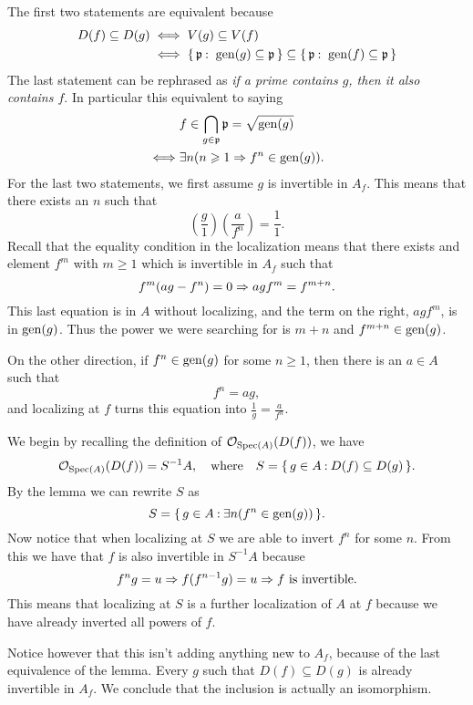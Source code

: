 \documentclass[12pt]{memoir}
\begin{document}
    \begin{ptcb}
        The first two statements are equivalent because 
        \begin{align*}
            D(f)\subseteq D(g)&\iff V(g)\subseteq V(f)\\
            &\iff \{\,\mathfrak{p}\mathbin{:}\ \operatorname{gen}(g)\subseteq\mathfrak{p}\,\}\subseteq \{\,\mathfrak{p}\mathbin{:}\ \operatorname{gen}(f)\subseteq\mathfrak{p}\,\}
        \end{align*}
        The last statement can be rephrased as \emph{if a prime contains $g$, then it also contains $f$}. In particular this equivalent to saying 
        \begin{align*}
        &f\in\bigcap_{g\in\mathfrak{p}}\mathfrak{p}=\sqrt{\operatorname{gen}(g)}\\
        \iff &\exists n(n\geqslant 1\Rightarrow f^n\in\operatorname{gen}(g)).
        \end{align*}
        For the last two statements, we first assume $g$ is invertible in $A_f$. This means that there exists an $n$ such that
        $$\left(\frac{g}{1}\right)\left(\frac{a}{f^n}\right)=\frac{1}{1}.$$
        Recall that the equality condition in the localization means that there exists and element $f^m$ with $m\geq 1$ which is invertible in $A_f$ such that 
        $$f^m(ag-f^n)=0\Rightarrow agf^m=f^{m+n}.$$
        This last equation is in $A$ without localizing, and the term on the right, $agf^m$, is in $\operatorname{gen}(g)$. Thus the power we were searching for is $m+n$ and $f^{m+n}\in\operatorname{gen}(g)$.\par 
        On the other direction, if $f^n\in\operatorname{gen}(g)$ for some $n\geq 1$, then there is an $a\in A$ such that 
        $$f^n=ag,$$
        and localizing at $f$ turns this equation into $\frac{1}{g}=\frac{a}{f^n}$. 
    \end{ptcb}
    \begin{ptcbr}
    We begin by recalling the definition of $\mathcal{O}_{\operatorname{Spec}(A)}(D(f))$, we have 
    $$\mathcal{O}_{\operatorname{Spec}(A)}(D(f))=S^{-1}A,\quad\text{where}\quad S=\{\,g\in A\mathbin{:} D(f)\subseteq D(g)\,\}.$$
    By the lemma we can rewrite $S$ as
    $$S=\{\,g\in A\mathbin{:} \exists n(f^n\in\operatorname{gen}(g))\,\}.$$
    Now notice that when localizing at $S$ we are able to invert $f^n$ for some $n$. From this we have that $f$ is also invertible in $S^{-1}A$ because 
    $$f^ng=u\Rightarrow f(f^{n-1}g)=u\Rightarrow f\text{ is invertible}.$$
    This means that localizing at $S$ is a further localization of $A$ at $f$ because we have already inverted all powers of $f$.\par 
    Notice however that this isn't adding anything new to $A_f$, because of the last equivalence of the lemma. Every $g$ such that $D(f)\subseteq D(g)$ is already invertible in $A_f$. We conclude that the inclusion is actually an isomorphism.
    \end{ptcbr}
\end{document}
